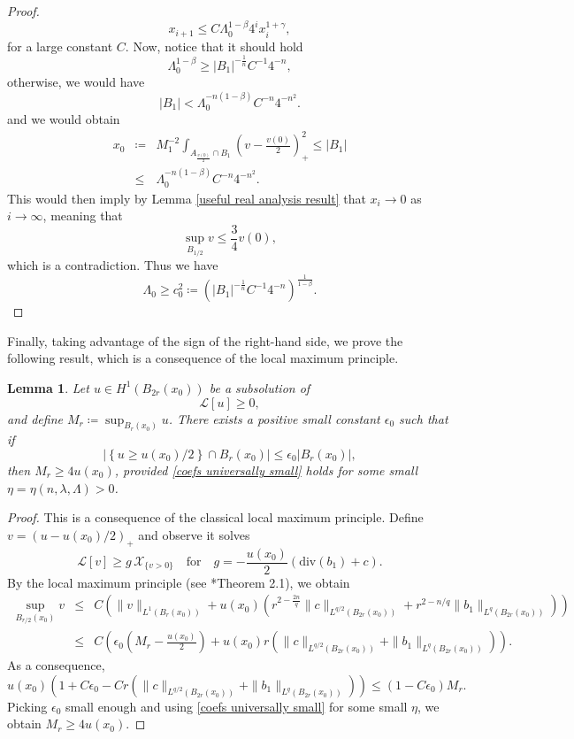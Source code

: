 \documentclass[12pt,a4paper]{amsart}
\numberwithin{equation}{section} %
\newtheorem{lemma}[theorem]{Lemma}
\theoremstyle{definition}
\theoremstyle{remark}
\begin{document}
\begin{proof}
$$
    x_{i+1} \leq C\Lambda_0^{1-\beta}4^i x_i^{1 + \gamma},
$$
for a large constant $C$. Now, notice that it should hold
$$
    \Lambda_0^{1-\beta} \geq |B_1|^{-\frac{1}{n}}C^{-1}4^{-n},
$$
otherwise, we would have
$$
    |B_1| < \Lambda_0^{-n(1-\beta)}C^{-n}4^{-n^2}.
$$
and we would obtain
\begin{eqnarray*}
    x_0 &\coloneqq& M_1^{-2} \int_{A_{\frac{v(0)}{2}} \cap B_1}\left(v-\frac{v(0)}{2}\right)^2_+ \leq  |B_1|\\
        & \leq & \Lambda_0^{-n(1-\beta)}C^{-n}4^{-n^2}.
\end{eqnarray*}
This would then imply by Lemma \ref{useful real analysis result} that $x_i \to 0$ as $i \to \infty$, meaning that
$$
    \sup_{B_{1/2}}v \leq \frac{3}{4}v(0),
$$
which is a contradiction. Thus we have
$$
    \Lambda_0 \geq c_0^2 \coloneqq \left(|B_1|^{-\frac{1}{n}}C^{-1}4^{-n} \right)^{\frac{1}{1-\beta}}.
$$
\end{proof}

Finally, taking advantage of the sign of the right-hand side, we prove the following result, which is a consequence of the local maximum principle.
\begin{lemma}\label{local max princ consequence}
Let $u \in H^1(B_{2r}(x_0))$ be a subsolution of
$$
    \mathcal{L}[u] \geq 0,
$$
and define $M_r \coloneqq \sup_{B_r(x_0)}u$. There exists a positive small constant $\epsilon_0$ such that if
$$
    \left|\left\{u \geq u(x_0)/2 \right\}\cap B_r(x_0)\right| \leq \epsilon_0|B_r(x_0)|,
$$
then $M_r \geq 4u(x_0)$, provided \eqref{coefs universally small} holds for some small $\eta=\eta(n,\lambda,\Lambda)>0$.
\end{lemma}

\begin{proof}
This is a consequence of the classical local maximum principle. Define $v = (u - u(x_0)/2)_+$ and observe it solves
$$
    \mathcal{L}[v] \geq g\,\mathcal{X}_{\{v>0 \}} \quad \mbox{for} \quad g = -\frac{u(x_0)}{2}\left(\mbox{div}(b_1) + c\right).
$$
By the local maximum principle (see \cite{SS21}*{Theorem 2.1}), we obtain
\begin{eqnarray*}
        \sup_{B_{r/2}(x_0)}v & \leq & C\left(\|v\|_{L^1(B_r(x_0))} + u(x_0)\left(r^{2 - \frac{2n}{q}}\|c\|_{L^{q/2}(B_{2r}(x_0))} + r^{2 - n/q}\|b_1\|_{L^q(B_{2r}(x_0))}\right) \right)\\
                    & \leq & C\left( \epsilon_0\left(M_r - \frac{u(x_0)}{2}\right) + u(x_0)r\left(\|c\|_{L^{q/2}(B_{2r}(x_0))} + \|b_1\|_{L^q(B_{2r}(x_0))}\right) \right).
\end{eqnarray*}
As a consequence,
$$
    u(x_0)\left(1 + C\epsilon_0  - Cr\left(\|c\|_{L^{q/2}(B_{2r}(x_0))} + \|b_1\|_{L^q(B_{2r}(x_0))}\right) \right) \leq (1-C\epsilon_0) M_r.
$$
Picking $\epsilon_0$ small enough and using \eqref{coefs universally small} for some small $\eta$, we obtain $M_r \geq 4u(x_0)$.
\end{proof}
\end{document}
